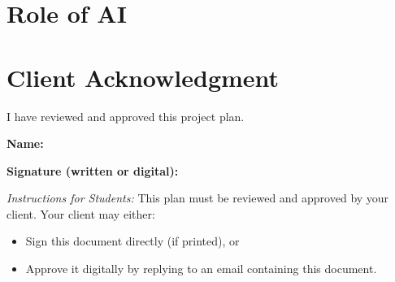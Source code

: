 \documentclass{article}
\begin{document}
\section*{Role of AI}

\section*{Client Acknowledgment}
I have reviewed and approved this project plan.  

\vspace{1em}
\noindent\textbf{Name:} \underline{\hspace{7cm}}  

\vspace{1em}
\noindent\textbf{Signature (written or digital):} \underline{\hspace{7cm}}  

\vspace{2em}
\noindent\textit{Instructions for Students:}  
This plan must be reviewed and approved by your client.  
Your client may either:  
\begin{itemize}
    \item Sign this document directly (if printed), or  
    \item Approve it digitally by replying to an email containing this document.  
\end{itemize}
\end{document}
